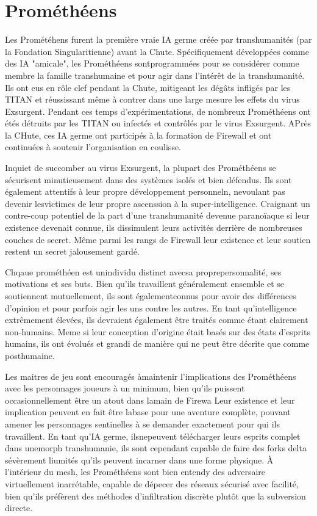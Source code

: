 \section{Prométhéens } 

Les Prométéhens furent la première vraie IA germe créée par transhumanités (par la Fondation Singularitienne) avant la Chute. Spécifiquement développées comme des IA "amicale", les Prométhéens sontprogrammées pour se considérer comme membre la famille transhumaine et pour agir dans l'intérêt de la transhumanité. Ils ont eus en rôle clef pendant la Chute, mitigeant les dégâts infligés par les TITAN et réussissant même à contrer dans une large mesure les effets du virus Exsurgent. Pendant ces temps d'expérimentations, de nombreux Prométhéens ont étés détruits par les TITAN ou infectés et contrôlés par le virus Exsurgent. APrès la CHute, ces IA germe ont participés à la formation de Firewall et ont continuées à soutenir l'organisation en coulisse. 

Inquiet de succomber au virus Exsurgent, la plupart des Prométhéens se sécurisent minutieusement dans des systèmes isolés et bien défendus. Ils sont également attentifs à leur propre développement personneln, nevoulant pas devenir lesvictimes de leur propre ascenssion à la super-intelligence. Craignant un contre-coup potentiel de la part d'une transhumanité devenue paranoïaque si leur existence devenait connue, ils dissimulent leurs activités derrière de nombreuses couches de secret. Même parmi les rangs de Firewall leur existence et leur soutien restent un secret jalousement gardé. 

Chqaue prométhéen est unindividu distinct avecsa proprepersonnalité, ses motivations et ses buts. Bien qu'ils travaillent généralement ensemble et se soutiennent mutuellement, ils sont égalementconnus pour avoir des différences d'opinion et pour parfois agir les uns contre les autres. En tant qu'intelligence extrêmement élevées, ils devraient également être traités comme étant clairement non-humains. Meme si leur conception d'origine était basés sur des états d'esprits humains, ils ont évolués et grandi de manière qui ne peut être décrite que comme posthumaine. 

Les maitres de jeu sont encouragés àmaintenir l'implications des Prométhéens avec les personnages joueurs à un minimum, bien qu'ils puissent occasionnellement être un atout dans lamain de Firewa Leur existence et leur implication peuvent en fait être labase pour une aventure complète, pouvant amener les personnages sentinelles à se demander exactement pour qui ils travaillent. En tant qu'IA germe, ilsnepeuvent télécharger leurs esprits complet dans unemorph transhumanie, ils sont cependant capable de faire des forks delta sévèrement liumités qu'ils peuvent incarner dans une forme physique. À l'intérieur du mesh, les Prométhéens sont bien entendy des adversaire virtuellement inarrétable, capable de dépecer des réseaux sécurisé avec facilité, bien qu'ils préfèrent des méthodes d'infiltration discrète plutôt que la subversion directe. 

